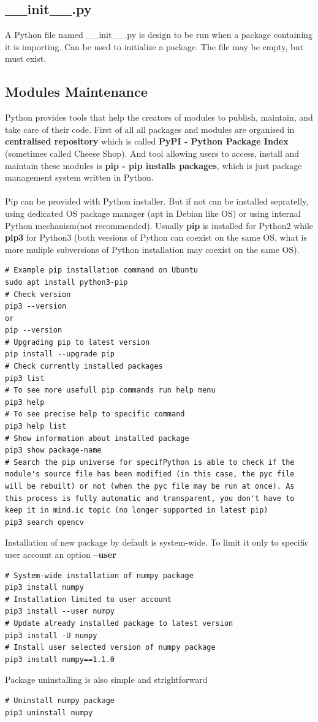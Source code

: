 \documentclass{article}
\begin{document}
\subsection{\_\_init\_\_.py}
A Python file named \_\_init\_\_.py is design to be run when a package containing it is importing. Can be used to initialize a package. The file may be empty, but must exist.


\subsection{Modules Maintenance}
Python provides tools that help the creators of modules to publish, maintain, and take care of their code. First of all all packages and modules are organised in \textbf{centralised repository} which is called \textbf{PyPI - Python Package Index} (sometimes called Cheese Shop). And tool allowing users to access, install and maintain these modules is \textbf{pip - pip installs packages}, which is just package management system written in Python.
\paragraph{}
Pip can be provided with Python installer. But if not can be installed sepratelly, using dedicated OS package manager (apt in Debian like OS) or using internal Python mechanism(not recommended). Usually \textbf{pip} is installed for Python2 while \textbf{pip3} for Python3 (both versions of Python can coexist on the same OS, what is more muliple subversions of Python installation may coexist on the same OS).
\begin{lstlisting}[style=bash]
# Example pip installation command on Ubuntu
sudo apt install python3-pip
# Check version
pip3 --version
or
pip --version
# Upgrading pip to latest version
pip install --upgrade pip
# Check currently installed packages
pip3 list
# To see more usefull pip commands run help menu
pip3 help
# To see precise help to specific command
pip3 help list
# Show information about installed package
pip3 show package-name
# Search the pip universe for specifPython is able to check if the module's source file has been modified (in this case, the pyc file will be rebuilt) or not (when the pyc file may be run at once). As this process is fully automatic and transparent, you don't have to keep it in mind.ic topic (no longer supported in latest pip)
pip3 search opencv
\end{lstlisting}
Installation of new package by default is system-wide. To limit it only to specific user account an option \textbf{--user}
\begin{lstlisting}[style=bash]
# System-wide installation of numpy package
pip3 install numpy
# Installation limited to user account
pip3 install --user numpy
# Update already installed package to latest version
pip3 install -U numpy
# Install user selected version of numpy package
pip3 install numpy==1.1.0
\end{lstlisting}
Package uninstalling is also simple and strightforward
\begin{lstlisting}[style=bash]
# Uninstall numpy package
pip3 uninstall numpy
\end{lstlisting}
\end{document}
